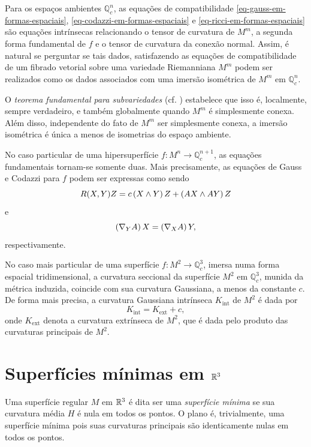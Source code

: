 Para os espaços ambientes $\mathbb{Q}^n_c$, as equações de compatibilidade \eqref{eq-gauss-em-formas-espaciais}, \eqref{eq-codazzi-em-formas-espaciais} e \eqref{eq-ricci-em-formas-espaciais} são equações intrínsecas relacionando o tensor de curvatura de $M^m$, a segunda forma fundamental de $f$ e o tensor de curvatura da conexão normal. Assim, é natural se perguntar se tais dados, satisfazendo as equações de compatibilidade de um fibrado vetorial sobre uma variedade Riemanniana $M^m$ podem ser realizados como os dados associados com uma imersão isométrica de $M^m$ em $\mathbb{Q}^n_c$.

O \emph{teorema fundamental para subvariedades} (cf. \cite[Theorem 1.10]{Dajczer2019}) estabelece que isso é, localmente, sempre verdadeiro, e também globalmente quando $M^m$ é simplesmente conexa. Além disso, independente do fato de $M^m$ ser simplesmente conexa, a imersão isométrica é única a menos de isometrias do espaço ambiente.

No caso particular de uma hipersuperfície $f: M^n \rightarrow \mathbb{Q}^{n+1}_c$, as equações fundamentais tornam-se somente duas. Mais precisamente, as equações de Gauss e Codazzi para $f$ podem ser expressas como sendo
\begin{equation}
	R(X,Y)Z = c \left( X \wedge Y \right) Z + \left( AX \wedge AY \right) Z
\end{equation}
e
\begin{equation}
	\left( \nabla_Y A \right) X = \left( \nabla_X A \right) Y,
\end{equation}
respectivamente.

No caso mais particular de uma superfície $f: M^2 \rightarrow \mathbb{Q}^3_c$, imersa numa forma espacial tridimensional, a curvatura seccional da superfície $M^2$ em $\mathbb{Q}^3_c$, munida da métrica induzida, coincide com sua curvatura Gaussiana, a menos da constante $c$. De forma mais precisa, a curvatura Gaussiana intrínseca $K_{\text{int}}$ de $M^2$ é dada por
\begin{equation}\label{eq:gausshyp}
	K_{\text{int}} = K_{\text{ext}} + c,
\end{equation}
onde $K_{\text{ext}}$ denota a curvatura extrínseca de $M^2$, que é dada pelo produto das curvaturas principais de $M^2$.


\section{Superfícies mínimas em $\mathbb{R}^3$}

Uma superfície regular $M$ em $\mathbb{R}^3$ é dita ser uma \emph{superfície mínima} se sua curvatura média $H$ é nula em todos os pontos. O plano é, trivialmente, uma superfície mínima pois suas curvaturas principais são identicamente nulas em todos os pontos.

